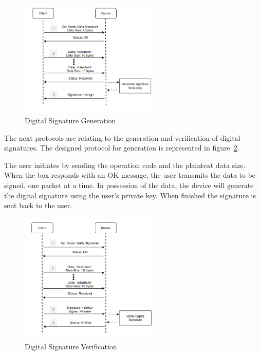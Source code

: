 \begin{figure}[h]
	\centering
	\includegraphics[width=0.6\textwidth]{./Images/signature-generate.png}
	\caption{Digital Signature Generation}
	\label{fig:protocol:signature-generate}
\end{figure}

The next protocols are relating to the generation and verification of digital signatures.
The designed protocol for generation is represented in figure~\ref{fig:protocol:signature-verify}.

The user initiates by sending the operation code and the plaintext data size.
When the box responds with an OK message, the user transmits the data to be signed, one packet at a time.
In possession of the data, the device will generate the digital signature using the user's private key. When finished the signature is sent back to the user.

\begin{figure}[h]
	\centering
	\includegraphics[width=0.6\textwidth]{./Images/signature-verify.png}
	\caption{Digital Signature Verification}
	\label{fig:protocol:signature-verify}
\end{figure}

